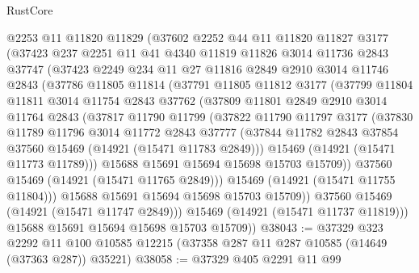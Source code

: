\begin{lexlean}{RustCore}
\begin{coremodule}
      @2253
      @11
      @11820
      @11829
      (@37602
        @2252
        @44
        @11
        @11820
        @11827
        @3177
        (@37423
          @237
          @2251
          @11
          @41
          @4340
          @11819
          @11826
          @3014
          @11736
          @2843
          @37747
          (@37423
            @2249
            @234
            @11
            @27
            @11816
            @2849
            @2910
            @3014
            @11746
            @2843
            (@37786
              @11805
              @11814
              (@37791
                @11805
                @11812
                @3177
                (@37799
                  @11804
                  @11811
                  @3014
                  @11754
                  @2843
                  @37762
                  (@37809
                    @11801
                    @2849
                    @2910
                    @3014
                    @11764
                    @2843
                    (@37817
                      @11790
                      @11799
                      (@37822
                        @11790
                        @11797
                        @3177
                        (@37830
                          @11789
                          @11796
                          @3014
                          @11772
                          @2843
                          @37777
                          (@37844 @11782 @2843 @37854 @37560 @15469 (@14921 (@15471 @11783 @2849)))
                          @15469
                          (@14921 (@15471 @11773 @11789)))
                        @15688
                        @15691
                        @15694
                        @15698
                        @15703
                        @15709))
                    @37560
                    @15469
                    (@14921 (@15471 @11765 @2849)))
                  @15469
                  (@14921 (@15471 @11755 @11804)))
                @15688
                @15691
                @15694
                @15698
                @15703
                @15709))
            @37560
            @15469
            (@14921 (@15471 @11747 @2849)))
          @15469
          (@14921 (@15471 @11737 @11819)))
        @15688
        @15691
        @15694
        @15698
        @15703
        @15709))
@38043 := @37329
    @323
    @2292
    @11
    @100
    @10585
    @12215
    (@37358 @287 @11 @287 @10585 (@14649 (@37363 @287)) @35221)
@38058 := @37329
    @405
    @2291
    @11
    @99

\end{coremodule}
\end{lexlean}
